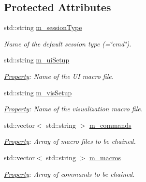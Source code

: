\subsection*{Protected Attributes}
\begin{DoxyCompactItemize}
\item 
std::string \hyperlink{class_d_d4hep_1_1_simulation_1_1_geant4_u_i_manager_aeef8066abb2d31001194f741f423a8b3}{m\_\-sessionType}
\begin{DoxyCompactList}\small\item\em Name of the default session type (=\char`\"{}cmd\char`\"{}). \item\end{DoxyCompactList}\item 
std::string \hyperlink{class_d_d4hep_1_1_simulation_1_1_geant4_u_i_manager_a9c86ca8f03b026e13ae71de58164b339}{m\_\-uiSetup}
\begin{DoxyCompactList}\small\item\em \hyperlink{class_d_d4hep_1_1_property}{Property}: Name of the UI macro file. \item\end{DoxyCompactList}\item 
std::string \hyperlink{class_d_d4hep_1_1_simulation_1_1_geant4_u_i_manager_aa1bdcdb2a02479af8627ea0ba6d12f69}{m\_\-visSetup}
\begin{DoxyCompactList}\small\item\em \hyperlink{class_d_d4hep_1_1_property}{Property}: Name of the visualization macro file. \item\end{DoxyCompactList}\item 
std::vector$<$ std::string $>$ \hyperlink{class_d_d4hep_1_1_simulation_1_1_geant4_u_i_manager_a9c64c0675309cf8f76c23249e58cf3db}{m\_\-commands}
\begin{DoxyCompactList}\small\item\em \hyperlink{class_d_d4hep_1_1_property}{Property}: Array of macro files to be chained. \item\end{DoxyCompactList}\item 
std::vector$<$ std::string $>$ \hyperlink{class_d_d4hep_1_1_simulation_1_1_geant4_u_i_manager_a37b623b5b76a886a17a0ce68ce484188}{m\_\-macros}
\begin{DoxyCompactList}\small\item\em \hyperlink{class_d_d4hep_1_1_property}{Property}: Array of commands to be chained. \item\end{DoxyCompactList}\item 

\end{DoxyCompactItemize}
